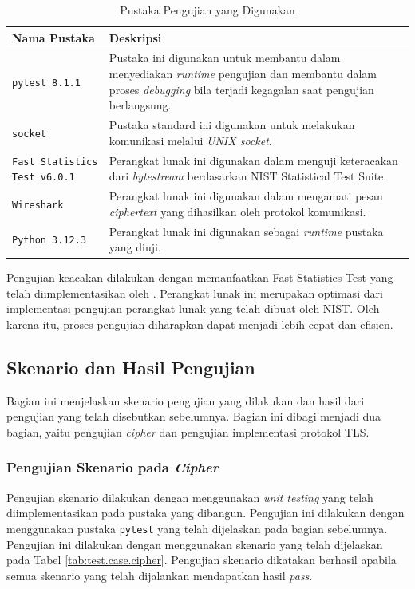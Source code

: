 \begin{table}[!h]
  \centering
  \caption{Pustaka Pengujian yang Digunakan} \label{tab:test.lib}
  \begin{tabular}{|p{4cm}|p{9cm}|}
    \hline
    \textbf{Nama Pustaka} & \textbf{Deskripsi} \\ \hline
    \texttt{pytest 8.1.1} & Pustaka ini digunakan untuk membantu dalam menyediakan \emph{runtime} pengujian dan membantu dalam proses \emph{debugging} bila terjadi kegagalan saat pengujian berlangsung. \\ \hline
    \texttt{socket} & Pustaka standard ini digunakan untuk melakukan komunikasi melalui \emph{UNIX socket}.\\ \hline
    \texttt{Fast Statistics Test v6.0.1} & Perangkat lunak ini digunakan dalam menguji keteracakan dari \emph{bytestream} berdasarkan NIST Statistical Test Suite.\\ \hline
    \texttt{Wireshark} & Perangkat lunak ini digunakan dalam mengamati pesan \emph{ciphertext} yang dihasilkan oleh protokol komunikasi.\\ \hline
    \texttt{Python 3.12.3} & Perangkat lunak ini digunakan sebagai \emph{runtime} pustaka yang diuji.\\ \hline
    \end{tabular}
  \end{table}
    

  Pengujian keacakan dilakukan dengan memanfaatkan Fast Statistics Test yang telah diimplementasikan oleh \textcite{marek2016}. Perangkat lunak ini merupakan optimasi dari implementasi pengujian perangkat lunak yang telah dibuat oleh NIST. Oleh karena itu, proses pengujian diharapkan dapat menjadi lebih cepat dan efisien. 

\subsection{Skenario dan Hasil Pengujian}

Bagian ini menjelaskan skenario pengujian yang dilakukan dan hasil dari pengujian yang telah disebutkan sebelumnya. Bagian ini dibagi menjadi dua bagian, yaitu pengujian \emph{cipher} dan pengujian implementasi protokol TLS.

\subsubsection{Pengujian Skenario pada \emph{Cipher}}

Pengujian skenario dilakukan dengan menggunakan \emph{unit testing} yang telah diimplementasikan pada pustaka yang dibangun. Pengujian ini dilakukan dengan menggunakan pustaka \texttt{pytest} yang telah dijelaskan pada bagian sebelumnya. Pengujian ini dilakukan dengan menggunakan skenario yang telah dijelaskan pada Tabel \ref{tab:test.case.cipher}. Pengujian skenario dikatakan berhasil apabila semua skenario yang telah dijalankan mendapatkan hasil \emph{pass}.

